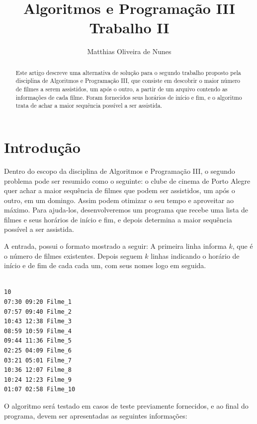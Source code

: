 \documentclass[12pt]{article}
\title{Algoritmos e Programação III\\ Trabalho II}
\author{Matthias Oliveira de Nunes}
\begin{document}
\maketitle

\begin{abstract}

Este artigo descreve uma alternativa de solução para o segundo trabalho proposto
pela disciplina de Algoritmos e Programação III, que consiste em descobrir o
maior número de filmes a serem assistidos, um após o outro, a partir de um
arquivo contendo as informações de cada filme. Foram fornecidos seus horários de
início e fim, e o algoritmo trata de achar a maior sequência possível a ser
assistida.

\end{abstract}

\section{Introdução}

Dentro do escopo da disciplina de Algoritmos e Programação III, o segundo
problema pode ser resumido como o seguinte: o clube de cinema de Porto Alegre
quer achar a maior sequência de filmes que podem ser assistidos, um após o
outro, em um domingo. Assim podem otimizar o seu tempo e aproveitar ao máximo.
Para ajuda-los, desenvolveremos um programa que recebe uma lista de filmes e
seus horários de início e fim, e depois determina a maior sequência possível a
ser assistida.

A entrada, possui o formato mostrado a seguir:  A primeira linha informa $k$,
que é o número de filmes existentes. Depois seguem $k$ linhas indicando o
horário de início e de fim de cada cada um, com seus nomes logo em seguida.

\vspace{2.0cm}

\begin{lstlisting}

10
07:30 09:20 Filme_1
07:57 09:40 Filme_2
10:43 12:38 Filme_3
08:59 10:59 Filme_4
09:44 11:36 Filme_5
02:25 04:09 Filme_6
03:21 05:01 Filme_7
10:36 12:07 Filme_8
10:24 12:23 Filme_9
01:07 02:58 Filme_10

\end{lstlisting}

\vspace{0.5cm}

O algoritmo será testado em casos de teste previamente fornecidos, e ao final do
programa, devem ser apresentadas as seguintes informações:
\end{document}
